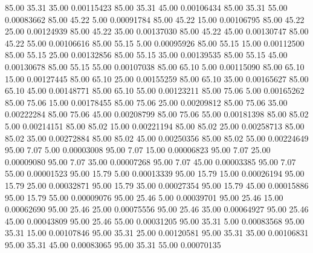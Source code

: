      85.00     35.31     35.00     0.00115423
     85.00     35.31     45.00     0.00106434
     85.00     35.31     55.00     0.00083662
     85.00     45.22      5.00     0.00091784
     85.00     45.22     15.00     0.00106795
     85.00     45.22     25.00     0.00124939
     85.00     45.22     35.00     0.00137030
     85.00     45.22     45.00     0.00130747
     85.00     45.22     55.00     0.00106616
     85.00     55.15      5.00     0.00095926
     85.00     55.15     15.00     0.00112500
     85.00     55.15     25.00     0.00132856
     85.00     55.15     35.00     0.00139535
     85.00     55.15     45.00     0.00130678
     85.00     55.15     55.00     0.00107038
     85.00     65.10      5.00     0.00115090
     85.00     65.10     15.00     0.00127445
     85.00     65.10     25.00     0.00155259
     85.00     65.10     35.00     0.00165627
     85.00     65.10     45.00     0.00148771
     85.00     65.10     55.00     0.00123211
     85.00     75.06      5.00     0.00165262
     85.00     75.06     15.00     0.00178455
     85.00     75.06     25.00     0.00209812
     85.00     75.06     35.00     0.00222284
     85.00     75.06     45.00     0.00208799
     85.00     75.06     55.00     0.00181398
     85.00     85.02      5.00     0.00214151
     85.00     85.02     15.00     0.00221194
     85.00     85.02     25.00     0.00258713
     85.00     85.02     35.00     0.00272884
     85.00     85.02     45.00     0.00250356
     85.00     85.02     55.00     0.00224649
     95.00      7.07      5.00     0.00003008
     95.00      7.07     15.00     0.00006823
     95.00      7.07     25.00     0.00009080
     95.00      7.07     35.00     0.00007268
     95.00      7.07     45.00     0.00003385
     95.00      7.07     55.00     0.00001523
     95.00     15.79      5.00     0.00013339
     95.00     15.79     15.00     0.00026194
     95.00     15.79     25.00     0.00032871
     95.00     15.79     35.00     0.00027354
     95.00     15.79     45.00     0.00015886
     95.00     15.79     55.00     0.00009076
     95.00     25.46      5.00     0.00039701
     95.00     25.46     15.00     0.00062690
     95.00     25.46     25.00     0.00075556
     95.00     25.46     35.00     0.00064927
     95.00     25.46     45.00     0.00043809
     95.00     25.46     55.00     0.00031205
     95.00     35.31      5.00     0.00083568
     95.00     35.31     15.00     0.00107846
     95.00     35.31     25.00     0.00120581
     95.00     35.31     35.00     0.00106831
     95.00     35.31     45.00     0.00083065
     95.00     35.31     55.00     0.00070135
